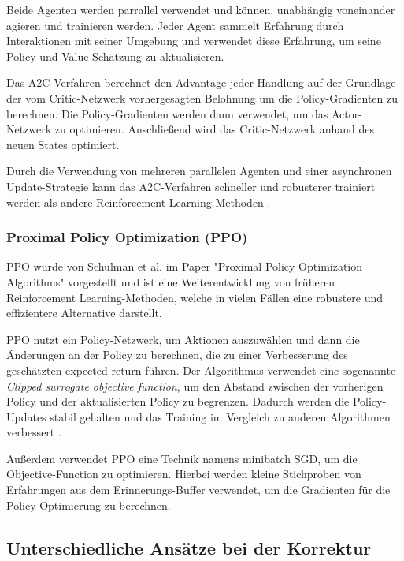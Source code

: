 \documentclass[oneside,bibliography=totocnumbered,BCOR=5mm]{scrbook}%
\theoremstyle{definition}
\theoremstyle{definition}
\theoremstyle{definition}
\theoremstyle{definition}
\theoremstyle{definition}
\theoremstyle{definition}
\begin{document}
  Beide Agenten werden parrallel verwendet und können, 
  unabhängig voneinander agieren und trainieren werden. 
  Jeder Agent sammelt Erfahrung durch Interaktionen mit seiner Umgebung und verwendet 
  diese Erfahrung, um seine Policy und Value-Schätzung zu aktualisieren. 
  
  Das A2C-Verfahren berechnet den Advantage jeder Handlung auf der Grundlage der
  vom Critic-Netzwerk vorhergesagten Belohnung um die Policy-Gradienten zu berechnen. 
  Die Policy-Gradienten werden dann verwendet, um das Actor-Netzwerk zu optimieren. 
  Anschließend wird das Critic-Netzwerk anhand des neuen States optimiert.
  
  Durch die Verwendung von mehreren parallelen Agenten und einer asynchronen 
  Update-Strategie kann das A2C-Verfahren schneller und robusterer trainiert 
  werden als andere Reinforcement Learning-Methoden \autocite[Seite 3]{A2C}. \\
  \linebreak[4]

\subsubsection{Proximal Policy Optimization (PPO)}

PPO wurde von Schulman et al. im Paper "Proximal Policy Optimization Algorithms" 
  vorgestellt und ist eine Weiterentwicklung von früheren Reinforcement Learning-Methoden, welche in
  vielen Fällen eine robustere und effizientere Alternative darstellt.

  PPO nutzt ein Policy-Netzwerk, um Aktionen auszuwählen und dann die Änderungen 
  an der Policy zu berechnen, die zu einer Verbesserung des geschätzten expected return führen. 
  Der Algorithmus verwendet eine sogenannte \textit{Clipped surrogate objective function}, 
  um den Abstand zwischen der vorherigen Policy und der aktualisierten Policy zu begrenzen. \autocite[Seite 3]{PPO}
  Dadurch werden die Policy-Updates stabil gehalten und das Training im Vergleich zu anderen Algorithmen verbessert \autocite[Seite 7]{PPO}.
  
  Außerdem verwendet PPO eine Technik namens minibatch SGD, um die Objective-Function zu optimieren. 
  Hierbei werden kleine Stichproben von Erfahrungen aus dem Erinnerungs-Buffer verwendet, 
  um die Gradienten für die Policy-Optimierung zu berechnen.\\
  \linebreak[4]
  

\subsection{Unterschiedliche Ansätze bei der Korrektur}
\end{document}

